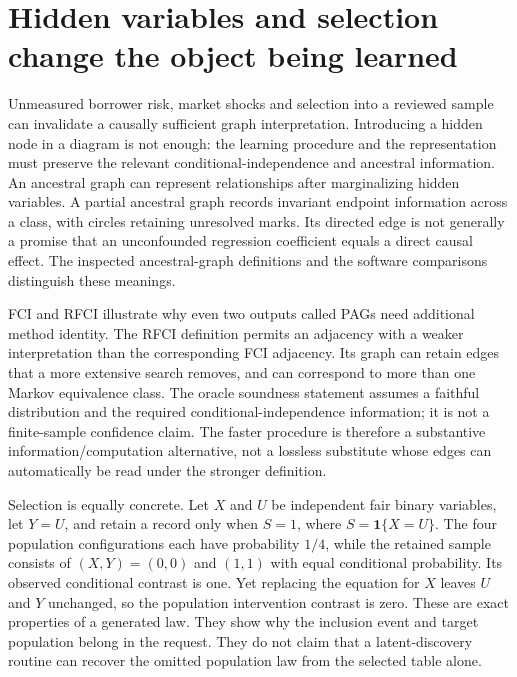 \section{Hidden variables and selection change the object being learned}

Unmeasured borrower risk, market shocks and selection into a reviewed sample
can invalidate a causally sufficient graph interpretation. Introducing a
hidden node in a diagram is not enough: the learning procedure and the
representation must preserve the relevant conditional-independence and
ancestral information. An ancestral graph can represent relationships after
marginalizing hidden variables. A partial ancestral graph records invariant
endpoint information across a class, with circles retaining unresolved marks.
Its directed edge is not generally a promise that an unconfounded regression
coefficient equals a direct causal effect. The inspected ancestral-graph
definitions and the software comparisons distinguish these meanings.
\citep{zhang2008,exec13_latentr_primary}

FCI and RFCI illustrate why even two outputs called PAGs need additional
method identity. The RFCI definition permits an adjacency with a weaker
interpretation than the corresponding FCI adjacency. Its graph can retain
edges that a more extensive search removes, and can correspond to more than
one Markov equivalence class. The oracle soundness statement assumes a
faithful distribution and the required conditional-independence information;
it is not a finite-sample confidence claim. The faster procedure is therefore
a substantive information/computation alternative, not a lossless substitute
whose edges can automatically be read under the stronger definition.
\citep{exec13_latentr_colombo2012}

Selection is equally concrete. Let $X$ and $U$ be independent fair binary
variables, let $Y=U$, and retain a record only when $S=1$, where
$S=\mathbf1\{X=U\}$. The four population configurations each have probability
$1/4$, while the retained sample consists of $(X,Y)=(0,0)$ and $(1,1)$ with
equal conditional probability. Its observed conditional contrast is one.
Yet replacing the equation for $X$ leaves $U$ and $Y$ unchanged, so the
population intervention contrast is zero. These are exact properties of a
generated law. They show why the inclusion event and target population belong
in the request. They do not claim that a latent-discovery routine can recover
the omitted population law from the selected table alone.
\citep{exec16_s2_exact}


